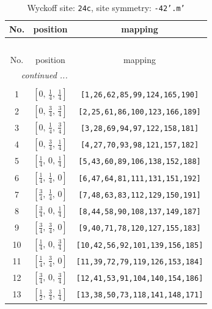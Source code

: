 \documentclass[fleqn,8pt]{jsarticle}
\begin{document}
\begin{longtable}{ccc}
\caption{Wyckoff site: {\tt 24c}, site symmetry: {\tt -42'.m'}}
 \\
 \hline \hline
No. & position & mapping \\ \hline \endfirsthead

\multicolumn{2}{l}{\tablename\ \thetable{}} \\
 \hline \hline
No. & position & mapping \\ \hline \endhead

 \hline \hline
\multicolumn{2}{r}{\footnotesize\it continued ...} \\ \endfoot

 \hline \hline
\multicolumn{2}{r}{} \\ \endlastfoot

1 & $\left[ 0,\, \frac{1}{4},\, \frac{1}{4} \right]$ & {\tt [1,26,62,85,99,124,165,190]} \\ \hline
2 & $\left[ 0,\, \frac{3}{4},\, \frac{3}{4} \right]$ & {\tt [2,25,61,86,100,123,166,189]} \\ \hline
3 & $\left[ 0,\, \frac{1}{4},\, \frac{3}{4} \right]$ & {\tt [3,28,69,94,97,122,158,181]} \\ \hline
4 & $\left[ 0,\, \frac{3}{4},\, \frac{1}{4} \right]$ & {\tt [4,27,70,93,98,121,157,182]} \\ \hline
5 & $\left[ \frac{1}{4},\, 0,\, \frac{1}{4} \right]$ & {\tt [5,43,60,89,106,138,152,188]} \\ \hline
6 & $\left[ \frac{1}{4},\, \frac{1}{4},\, 0 \right]$ & {\tt [6,47,64,81,111,131,151,192]} \\ \hline
7 & $\left[ \frac{3}{4},\, \frac{1}{4},\, 0 \right]$ & {\tt [7,48,63,83,112,129,150,191]} \\ \hline
8 & $\left[ \frac{3}{4},\, 0,\, \frac{1}{4} \right]$ & {\tt [8,44,58,90,108,137,149,187]} \\ \hline
9 & $\left[ \frac{3}{4},\, \frac{3}{4},\, 0 \right]$ & {\tt [9,40,71,78,120,127,155,183]} \\ \hline
10 & $\left[ \frac{1}{4},\, 0,\, \frac{3}{4} \right]$ & {\tt [10,42,56,92,101,139,156,185]} \\ \hline
11 & $\left[ \frac{1}{4},\, \frac{3}{4},\, 0 \right]$ & {\tt [11,39,72,79,119,126,153,184]} \\ \hline
12 & $\left[ \frac{3}{4},\, 0,\, \frac{3}{4} \right]$ & {\tt [12,41,53,91,104,140,154,186]} \\ \hline
13 & $\left[ \frac{1}{2},\, \frac{3}{4},\, \frac{1}{4} \right]$ & {\tt [13,38,50,73,118,141,148,171]} \\ \hline

\end{longtable}
\end{document}
